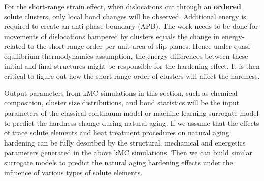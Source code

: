 For the short-range strain effect, when dislocations cut through an \textbf{ordered} solute clusters, only local bond changes will be observed. Additional energy is required to create an anti-phase boundary (APB). The work needs to be done for movements of dislocations hampered by clusters equals the change in energy-related to the short-range order per unit area of slip planes. Hence under quasi-equilibrium thermodynamics assumption, the energy differences between these initial and final structures might be responsible for the hardening effect. It is then critical to figure out how the short-range order of clusters will affect the hardness.

Output parameters from \ac{kMC} simulations in this section, such as chemical composition, cluster size distributions, and bond statistics will be the input parameters of the classical continuum model or machine learning surrogate model to predict the hardness change during natural aging. If we assume that the effects of trace solute elements and heat treatment procedures on natural aging hardening can be fully described by the structural, mechanical and energetics parameters generated in the above \ac{kMC} simulations. Then we can build similar surrogate models to predict the natural aging hardening effects under the influence of various types of solute elements.